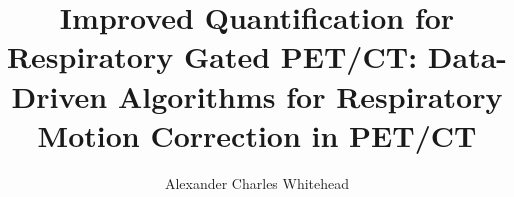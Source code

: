 \title{Improved Quantification for Respiratory Gated PET/CT: Data-Driven Algorithms for Respiratory Motion Correction in PET/CT}
\author{Alexander Charles Whitehead}

\maketitle
\makedeclaration





\tableofcontents
\listoffigures
\listoftables
\printglossaries
